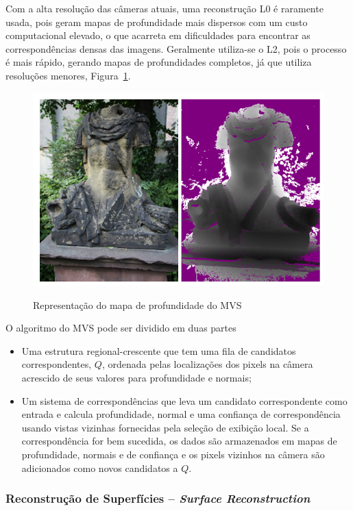 Com a alta resolução das câmeras atuais, uma reconstrução L0 é raramente usada, pois
geram mapas de profundidade mais dispersos com um custo computacional elevado, o
que acarreta em dificuldades para encontrar as correspondências densas das
imagens. Geralmente utiliza-se o L2, pois o processo é mais rápido, gerando
mapas de profundidades completos, já que utiliza resoluções menores, Figura~\ref{fig:mvedepth}.

\newpage

\begin{figure}[!h]
	\centering
	\caption{Representação do mapa de profundidade do MVS}
	\includegraphics[width=0.7\linewidth]{figs/mvedepth.png}
   \label{fig:mvedepth}
\end{figure}

O algoritmo do MVS pode ser dividido em duas partes

\begin{itemize}
\item {Uma estrutura regional-crescente que tem uma fila de candidatos
  correspondentes, $Q$, ordenada pelas localizações dos pixels na câmera
acrescido de seus valores para profundidade e normais;}
\item {Um sistema de correspondências que leva um candidato correspondente como
  entrada e calcula profundidade, normal e uma confiança de correspondência
usando vistas vizinhas fornecidas pela seleção de exibição local. Se a
correspondência for bem sucedida, os dados são armazenados em mapas de
profundidade, normais e de confiança e os pixels vizinhos na câmera são
adicionados como novos candidatos a $Q$.}
\end{itemize}

\subsubsection{Reconstrução de Superfícies -- \emph{Surface Reconstruction}}

